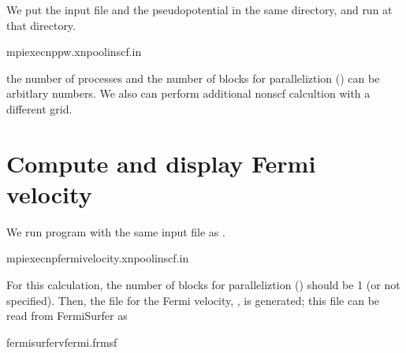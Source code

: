 \documentclass[letterpaper,10pt,pdftex,openany,english]{sphinxmanual}
\begin{document}
\sphinxAtStartPar
We put the input file and the pseudopotential in the same directory,
and run  at that directory.

\begin{sphinxVerbatim}[commandchars=\\\{\}]
\PYGZdl{}mpiexec\PYGZhy{}nppw.x\PYGZhy{}npool\PYGZhy{}inscf.in
\end{sphinxVerbatim}

\sphinxAtStartPar
the number of processes and the number of blocks for \sphinxhyphen{}paralleliztion ()
can be arbitlary numbers.
We also can perform additional non\sphinxhyphen{}scf calcultion with a different \sphinxhyphen{}grid.


\section{Compute and display Fermi velocity}
\label{\detokenize{qe:compute-and-display-fermi-velocity}}
\sphinxAtStartPar
We run  program with the same input file as .

\begin{sphinxVerbatim}[commandchars=\\\{\}]
\PYGZdl{}mpiexec\PYGZhy{}npfermi\PYGZus{}velocity.x\PYGZhy{}npool\PYGZhy{}inscf.in
\end{sphinxVerbatim}

\sphinxAtStartPar
For this calculation, the number of blocks for \sphinxhyphen{}paralleliztion ()
should be 1 (or not specified).
Then, the file for the Fermi velocity, , is generated;
this file can be read from FermiSurfer as

\begin{sphinxVerbatim}[commandchars=\\\{\}]
\PYGZdl{}fermisurfervfermi.frmsf
\end{sphinxVerbatim}

\begin{figure}[htbp]
\centering

\noindent{}
\end{figure}
\end{document}

